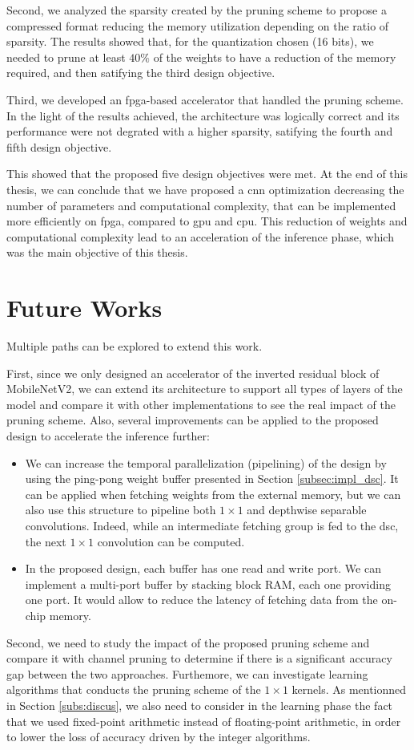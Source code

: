 Second, we analyzed the sparsity created by the pruning scheme to propose a compressed format reducing the memory utilization depending on the ratio of sparsity. The results showed that, for the quantization chosen (16 bits), we needed to prune at least $40 \%$ of the weights to have a reduction of the memory required, and then satifying the third design objective. 

Third, we developed an \acrshort{fpga}-based accelerator that handled the pruning scheme. In the light of the results achieved, the architecture was logically correct and its performance were not degrated with a higher sparsity, satifying the fourth and fifth design objective.

This showed that the proposed five design objectives were met. At the end of this thesis, we can conclude that we have proposed a \acrshort{cnn} optimization decreasing the number of parameters and computational complexity, that can be implemented more efficiently on \acrshort{fpga}, compared to \acrshort{gpu} and \acrshort{cpu}. This reduction of weights and computational complexity lead to an acceleration of the inference phase, which was the main objective of this thesis.
%
\section*{Future Works}
%
Multiple paths can be explored to extend this work.

First, since we only designed an accelerator of the inverted residual block of MobileNetV2, we can extend its architecture to support all types of layers of the model and compare it with other implementations to see the real impact of the pruning scheme. Also, several improvements can be applied to the proposed design to accelerate the inference further:
%
\begin{itemize}
    \item We can increase the temporal parallelization (pipelining) of the design by using the ping-pong weight buffer presented in Section \ref{subsec:impl_dsc}. It can be applied when fetching weights from the external memory, but we can also use this structure to pipeline both $1 \times 1$ and depthwise separable convolutions. Indeed, while an intermediate fetching group is fed to the \acrshort{dsc}, the next $1 \times 1$ convolution can be computed. 
    \item In the proposed design, each buffer has one read and write port. We can implement a multi-port buffer by stacking block RAM, each one providing one port. It would allow to reduce the latency of fetching data from the on-chip memory.
\end{itemize}
%
Second, we need to study the impact of the proposed pruning scheme and compare it with channel pruning to determine if there is a significant accuracy gap between the two approaches. Furthemore, we can investigate learning algorithms that conducts the pruning scheme of the $1 \times 1$ kernels. As mentionned in Section \ref{subs:discus}, we also need to consider in the learning phase the fact that we used fixed-point arithmetic instead of floating-point arithmetic, in order to lower the loss of accuracy driven by the integer algorithms.

